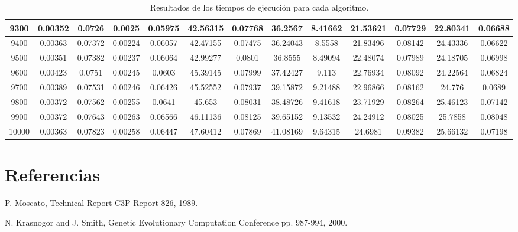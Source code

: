 \documentclass[conference]{IEEEtran}
\begin{document}
\begin{table}[!ht]
\begin{tabular}{|c|c|c|c|c|c|c|c|c|c|c|c|c|}
\hline
9300 & 0.00352 & 0.0726 & 0.0025 & 0.05975 & 42.56315 & 0.07768 & 36.2567 & 8.41662 &21.53621 & 0.07729 & 22.80341 & 0.06688 \\
\hline
9400 & 0.00363 & 0.07372 & 0.00224 & 0.06057 & 42.47155 & 0.07475 & 36.24043 & 8.5558 &21.83496 & 0.08142 & 24.43336 & 0.06622 \\
\hline
9500 & 0.00351 & 0.07382 & 0.00237 & 0.06064 & 42.99277 & 0.0801 & 36.8555 & 8.49094 &22.48074 & 0.07989 & 24.18705 & 0.06998 \\
\hline
9600 & 0.00423 & 0.0751 & 0.00245 & 0.0603 & 45.39145 & 0.07999 & 37.42427 & 9.113 &22.76934 & 0.08092 & 24.22564 & 0.06824 \\
\hline
9700 & 0.00389 & 0.07531 & 0.00246 & 0.06426 & 45.52552 & 0.07937 & 39.15872 & 9.21488 &22.96866 & 0.08162 & 24.776 & 0.0689 \\
\hline
9800 & 0.00372 & 0.07562 & 0.00255 & 0.0641 & 45.653 & 0.08031 & 38.48726 & 9.41618 &23.71929 & 0.08264 & 25.46123 & 0.07142 \\
\hline
9900 & 0.00372 & 0.07643 & 0.00263 & 0.06566 & 46.11136 & 0.08125 & 39.65152 & 9.13532 &24.24912 & 0.08025 & 25.7858 & 0.08048 \\
\hline
10000 & 0.00363 & 0.07823 & 0.00258 & 0.06447 & 47.60412 & 0.07869 & 41.08169 & 9.64315 &24.6981 & 0.09382 & 25.66132 & 0.07198 \\
\hline


\end{tabular}
\caption{Resultados de los tiempos de ejecuci\'on para cada algoritmo.}
\end{table}



\section{Referencias}


%


\begin{thebibliography}{1}

P. Moscato,
\newblock  Technical Report C3P Report 826, 1989.

%
N. Krasnogor and J. Smith,
\newblock Genetic Evolutionary Computation Conference pp. 987-994, 2000. 

\end{thebibliography}
\end{document}
